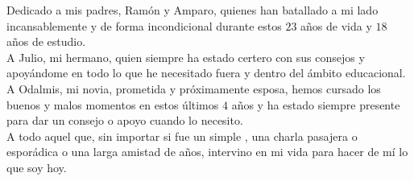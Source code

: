 
\begin{phrase}[4.2in]
	Dedicado a mis padres, Ramón y Amparo, quienes han batallado a mi lado incansablemente y de forma incondicional durante estos $23$ años de vida y $18$ años de estudio.\\
	A Julio, mi hermano, quien siempre ha estado certero con sus consejos y apoyándome en todo lo que he necesitado fuera y dentro del ámbito educacional.\\
	A Odalmis, mi novia, prometida y próximamente esposa, hemos cursado los buenos y malos momentos en estos últimos $4$ años y ha estado siempre presente para dar un consejo o apoyo cuando lo necesito.\\
	A todo aquel que, sin importar si fue un simple , una charla pasajera o esporádica o una larga amistad de años, intervino en mi vida para hacer de mí lo que soy hoy.
\end{phrase}